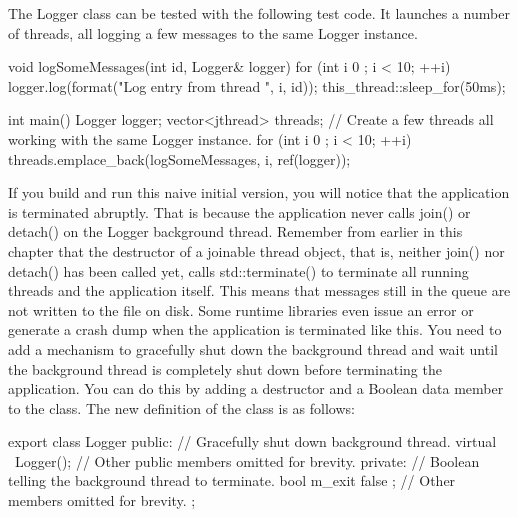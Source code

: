 The Logger class can be tested with the following test code. It launches a number of threads, all logging a few messages to the same Logger instance.

\begin{cpp}
void logSomeMessages(int id, Logger& logger)
{
    for (int i { 0 }; i < 10; ++i) {
        logger.log(format("Log entry {} from thread {}", i, id));
        this_thread::sleep_for(50ms);
    }
}

int main()
{
    Logger logger;
    vector<jthread> threads;
    // Create a few threads all working with the same Logger instance.
    for (int i { 0 }; i < 10; ++i) {
        threads.emplace_back(logSomeMessages, i, ref(logger));
    }
}
\end{cpp}

If you build and run this naive initial version, you will notice that the application is terminated abruptly. That is because the application never calls join() or detach() on the Logger background thread. Remember from earlier in this chapter that the destructor of a joinable thread object, that is, neither join() nor detach() has been called yet, calls std::terminate() to terminate all running threads and the application itself. This means that messages still in the queue are not written to the file on disk. Some runtime libraries even issue an error or generate a crash dump when the application is terminated like this. You need to add a mechanism to gracefully shut down the background thread and wait until the background thread is completely shut down before terminating the application. You can do this by adding a destructor and a Boolean data member to the class. The new definition of the class is as follows:

\begin{cpp}
export class Logger
{
    public:
        // Gracefully shut down background thread.
        virtual ~Logger();
        // Other public members omitted for brevity.
    private:
        // Boolean telling the background thread to terminate.
        bool m_exit { false };
        // Other members omitted for brevity.
};
\end{cpp}

